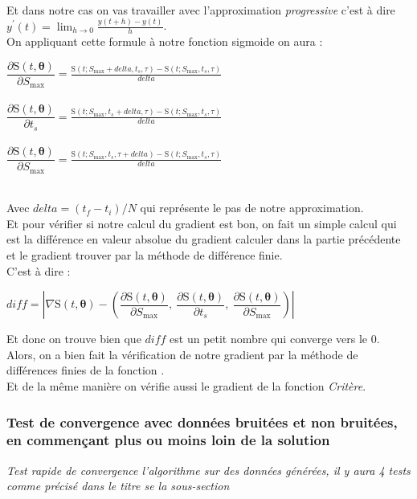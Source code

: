 \documentclass{article}
\begin{document}
\\
Et dans notre cas on vas travailler avec l'approximation \textit{progressive} c'est à dire $y^{'}(t)=\lim_{h\rightarrow 0} \frac{y(t+h)-y(t)}{h}$.\\
 On appliquant cette formule à notre fonction sigmoide on aura : \\

\begin{center}
$\dfrac{\partial \text{S}(t,\boldsymbol{\theta })}{ \partial S_{\text{max}}}=\frac{\text{S}(t;S_{\max}+delta,t_{s},\tau)-\text{S}(t;S_{\max},t_{s},\tau)}{delta}$\\
$~$\\
$\dfrac{\partial \text{S}(t,\boldsymbol{\theta })}{ \partial t_{s}}=\frac{\text{S}(t;S_{\max},t_{s}+delta,\tau)-\text{S}(t;S_{\max},t_{s},\tau)}{delta}$\\
$~$\\
$\dfrac{\partial \text{S}(t,\boldsymbol{\theta })}{ \partial S_{\text{max}}}=\frac{\text{S}(t;S_{\max},t_{s},\tau+delta)-\text{S}(t;S_{\max},t_{s},\tau)}{delta}$\\
\end{center}
\\
Avec $delta=(t_{f}-t_{i})/N$ qui représente le pas de notre approximation.\\
Et pour vérifier si notre calcul du gradient est bon, on fait un simple calcul qui est la différence en valeur absolue du gradient calculer dans la partie précédente et le gradient trouver par la méthode de différence finie.\\
C'est à dire :\\
\begin{center}
  $diff=|{\nabla} \text{S}(t,\boldsymbol{\theta })-(\dfrac{\partial \text{S}(t,\boldsymbol{\theta })}{ \partial S_{\text{max}}},~\dfrac{\partial \text{S}(t,\boldsymbol{\theta })}{ \partial t_{s}},~\dfrac{\partial \text{S}(t,\boldsymbol{\theta })}{ \partial S_{\text{max}}})|$
\end{center}
Et donc on trouve bien que $diff$ est un petit nombre qui converge vers le $0$.\\ 
Alors, on a bien fait la vérification de notre gradient par la méthode de différences finies de la fonction .\\
Et de la m\^{e}me manière on vérifie aussi le gradient de la fonction \textit{Critère}.\\


\subsubsection{Test de convergence avec données bruitées et non bruitées, en commençant plus ou moins loin de la solution}
\textit{Test rapide de convergence l'algorithme sur des données générées, il y aura 4 tests comme précisé dans le titre se la sous-section}
\end{document}
